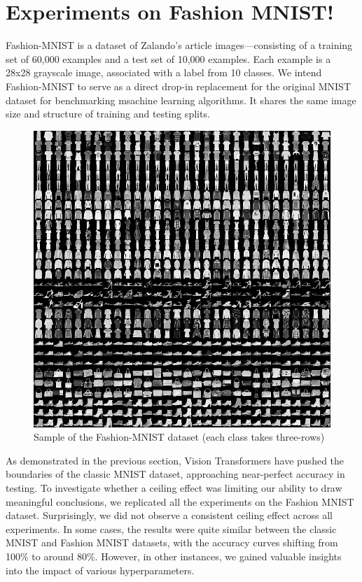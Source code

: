 \section{Experiments on Fashion MNIST!}
Fashion-MNIST is a dataset of Zalando's article images—consisting of a training set of 60,000 examples and a test set of 10,000 examples. Each example is a 28x28 grayscale image, associated with a label from 10 classes. We intend Fashion-MNIST to serve as a direct drop-in replacement for the original MNIST dataset for benchmarking msachine learning algorithms. It shares the same image size and structure of training and testing splits.

\begin{figure}[H]
    \centering
    \includegraphics*[width=.6\textwidth]{figs/Transformers/fashion-mnist-sprite.png}
    \caption{Sample of the Fashion-MNIST dataset (each class takes three-rows)}
\end{figure}

As demonstrated in the previous section, Vision Transformers have pushed the boundaries of the classic MNIST dataset, approaching near-perfect accuracy in testing. To investigate whether a ceiling effect was limiting our ability to draw meaningful conclusions, we replicated all the experiments on the Fashion MNIST dataset. Surprisingly, we did not observe a consistent ceiling effect across all experiments. In some cases, the results were quite similar between the classic MNIST and Fashion MNIST datasets, with the accuracy curves shifting from 100\% to around 80\%. However, in other instances, we gained valuable insights into the impact of various hyperparameters.


